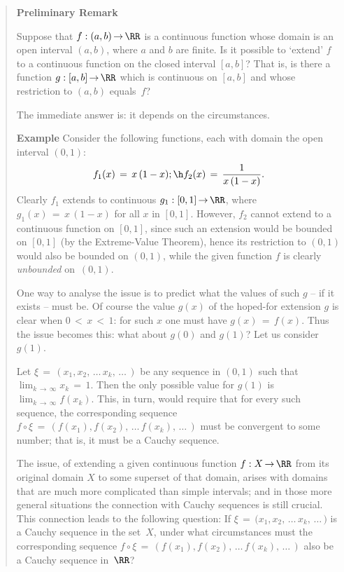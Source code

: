 \begin{quotation}
{\VV

        {\bf Preliminary Remark} 

\VV

        Suppose that $f:(a,b) \,{\rightarrow}\, {\RR}$ is a continuous function whose domain is an open interval $(a,b)$, where $a$ and $b$ are finite.
    Is it possible to `extend' $f$ to a continuous function on the closed interval $[a,b]$?
    That is, is there a function $g:[a,b] \,{\rightarrow}\, {\RR}$ which is continuous on $[a,b]$ and whose restriction to $(a,b)$ equals~$f$?

        The immediate answer is: it depends on the circumstances.
\V

        {\bf Example} Consider the following functions, each with domain the open interval $(0,1)$:
        \begin{displaymath}
        f_{1}(x) \,=\, x\,(1-x); \h f_{2}(x) \,=\, \frac{1}{x\,(1-x)}.
        \end{displaymath}
    Clearly $f_{1}$ extends to continuous $g_{1}:[0,1] \,{\rightarrow}\, {\RR}$, where $g_{1}(x) \,=\, x\,(1-x)$ for all $x$ in $[0,1]$.
    However, $f_{2}$ cannot extend to a continuous function on $[0,1]$, since such an extension would be bounded on $[0,1]$ (by the Extreme-Value Theorem), 
    hence its restriction to $(0,1)$ would also be bounded on $(0,1)$, while the given function $f$ is clearly {\em unbounded} on~$(0,1)$.

\V

        One way to analyse the issue is to predict what the values of such $g$ -- if it exists -- must be.
    Of course the value $g(x)$ of the hoped-for extension $g$ is clear when $0\,<\,x\,<\,1$: for such $x$ one must have $g(x) \,=\, f(x)$.
    Thus the issue becomes this: what about $g(0)$ and $g(1)$? Let us consider $g(1)$.

        Let ${\xi} \,=\, (x_{1}, x_{2},\,{\ldots}\,x_{k},\,{\ldots}\,)$ be any sequence in $(0,1)$
    such that $\lim_{k \,{\rightarrow}\, {\infty}} x_{k} \,=\, 1$. Then the only possible value for $g(1)$ is $\lim_{k \,{\rightarrow}\, {\infty}} f(x_{k})$.
    This, in turn, would require that for every such sequence, the corresponding sequence
    $f{\circ}{\xi} \,=\, (f(x_{1}),f(x_{2}),\,{\ldots}\,f(x_{k}),\,{\ldots}\,)$ must be convergent to some number; that is, it must be a Cauchy sequence.

\VV

        The issue, of extending a given continuous function $f:X \,{\rightarrow}\, {\RR}$
    from its original domain $X$ to some superset of that domain, arises with domains that are much more complicated than simple intervals;
    and in those more general situations the connection with Cauchy sequences is still crucial. This connection leads to the following question:
    If ${\xi} \,=\, {(x_{1},x_{2}},\,{\ldots}\,x_{k},\,{\ldots}\,)$ is a Cauchy sequence in the set~$X$,
    under what circumstances must the corresponding sequence $f{\circ}{\xi} \,=\, (f(x_{1}),f(x_{2}),\,{\ldots}\,f(x_{k}),\,{\ldots}\,)$
    also be a Cauchy sequence in~${\RR}$?

}
\end{quotation}
